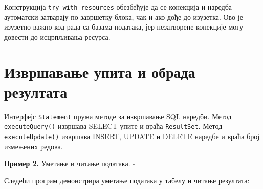 Конструкција \texttt{try-with-resources} обезбеђује да се конекција и наредба аутоматски затварају по завршетку блока, чак и ако дође до изузетка. Ово је изузетно важно код рада са базама података, јер незатворене конекције могу довести до исцрпљивања ресурса.


\section{Извршавање упита и обрада резултата}

Интерфејс \texttt{Statement} пружа методе за извршавање SQL наредби. Метод \texttt{executeQuery()} извршава SELECT упите и враћа \texttt{ResultSet}. Метод \texttt{executeUpdate()} извршава INSERT, UPDATE и DELETE наредбе и враћа број измењених редова.


\bigskip

\noindent \textbf{Пример 2.} Уметање и читање података. $\square$

\medskip

Следећи програм демонстрира уметање података у табелу и читање резултата:



